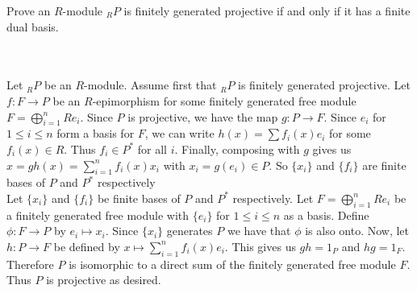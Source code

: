 Prove an $R$-module $_RP$ is finitely generated projective if and only if it has a finite dual basis.\\\\

\begin{solution}\renewcommand{\qedsymbol}{}\ \\

    Let $_RP$ be an $R$-module. Assume first that $_RP$ is finitely generated projective. Let $f:F\to P$
    be an $R$-epimorphism for some finitely generated free module $F=\bigoplus_{i=1}^nRe_i$. Since $P$
    is projective, we have the map $g:P\to F$. Since $e_i$ for $1\leq i\leq n$ form a basis for $F$, we
    can write $h(x)=\sum f_i(x)e_i$ for some $f_i(x)\in R$. Thus $f_i\in P^*$ for all $i$. Finally,
    composing with $g$ gives us $x=gh(x)=\sum_{i=1}^nf_i(x)x_i$ with $x_i=g(e_i)\in P$. So $\{x_i\}$
    and $\{f_i\}$ are finite bases of $P$ and $P^*$ respectively\\
    
    Let $\{x_i\}$ and $\{f_i\}$ be finite bases of $P$ and $P^*$ respectively. Let
    $F=\bigoplus_{i=1}^nRe_i$ be a finitely generated free module with $\{e_i\}$ for $1\leq i\leq n$ as
    a basis. Define $\phi:F\to P$ by $e_i\mapsto x_i$. Since $\{x_i\}$ generates $P$ we have that
    $\phi$ is also onto. Now, let $h:P\to F$ be defined by $x\mapsto\sum_{i=1}^nf_i(x)e_i$.
    This gives us $gh=1_P$ and $hg=1_F$. Therefore $P$ is isomorphic to a direct sum of the finitely
    generated free module $F$. Thus $P$ is projective as desired.

\end{solution}
